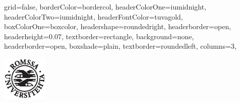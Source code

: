 \documentclass[fontscale=0.35,landscape,paperwidth=841mm,paperheight=1189mm]{baposter}  %
\begin{document}
	\setlength{\pdfpageheight}{\paperheight}
	\setlength{\pdfpagewidth}{\paperwidth}


	\begin{poster}{
		grid=false,
		borderColor=bordercol,
		headerColorOne=iumidnight,
		headerColorTwo=iumidnight,
		headerFontColor=tuvagold,
		boxColorOne=boxcolor,
		headershape=roundedright,
		headerborder=open,
		headerheight=0.07\textheight,
		textborder=rectangle,
		background=none,
		headerborder=open,
		boxshade=plain,
		textborder=roundedleft,
		columns=3,
	}{ %
		\setlength\fboxsep{0.5em}
		\setlength\fboxrule{0pt}
		\includegraphics[height=5.8em]{uitlogo}\hspace{1em}

}
\end{poster}
\end{document}
